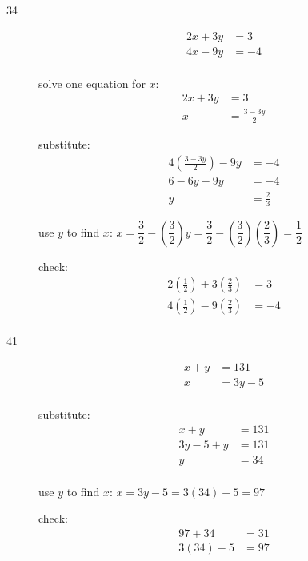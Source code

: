\documentclass[fleqn,addpoints]{exam}
\begin{document}
\begin{description}
\item[34]
\begin{align*}
  2x+3y &= 3 \\
  4x-9y &= -4 \\
\end{align*}

solve one equation for $x$:
\begin{align*}
  2x+3y &= 3 \\
  x &= \frac{3 - 3y}{2}
\end{align*}

substitute:
\begin{align*}
  4 \left( \frac{3-3y}{2} \right) -9y &= -4 \\
  6 - 6y - 9y &= -4 \\
  y &= \frac{2}{3}
\end{align*}

use $y$ to find $x$: $x = \dfrac{3}{2} - \left( \dfrac{3}{2} \right)y 
  = \dfrac{3}{2} - \left( \dfrac{3}{2} \right) \left( \dfrac{2}{3} \right)
  = \dfrac{1}{2}$

\vspace{0.2 cm}
\vspace{0.2 cm}

check:
\begin{align*}
  2\left( \frac{1}{2} \right)+3\left( \frac{2}{3} \right) &= 3 \\
  4\left( \frac{1}{2} \right)-9\left( \frac{2}{3} \right) &= -4 \\
\end{align*}

\item[41]
\begin{align*}
  x+y &= 131 \\
  x &= 3y - 5 \\
\end{align*}

substitute:
\begin{align*}
  x+y &= 131 \\
  3y-5+y &= 131 \\
  y &= 34 \\
\end{align*}

use $y$ to find $x$: $x = 3y - 5 = 3(34) - 5 = 97$

\vspace{0.2 cm}
\vspace{0.2 cm}

check:
\begin{align*}
  97 + 34 &= 31 \\
  3(34) - 5 &= 97 \\
\end{align*}


\end{description}
\end{document}
